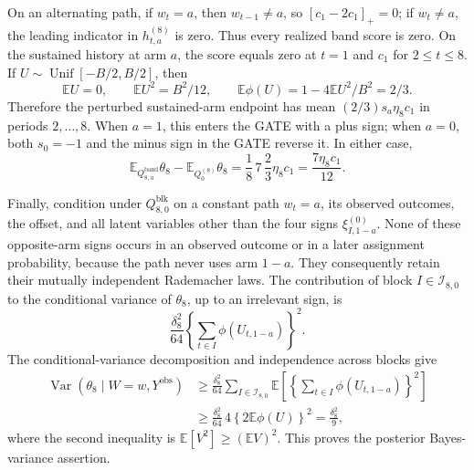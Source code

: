 On an alternating path, if \(w_t=a\), then \(w_{t-1}\ne a\), so \([c_1-2c_1]_+=0\); if \(w_t\ne a\), the leading indicator in \(h_{t,a}^{(8)}\) is zero.  Thus every realized band score is zero.  On the sustained history at arm \(a\), the score equals zero at \(t=1\) and \(c_1\) for \(2\le t\le8\).  If \(U\sim\operatorname{Unif}[-B/2,B/2]\), then
\[
 \mathbb E U=0,
 \qquad
 \mathbb E U^2=B^2/12,
 \qquad
 \mathbb E\phi(U)=1-4\mathbb EU^2/B^2=2/3.
\]
Therefore the perturbed sustained-arm endpoint has mean \((2/3)s_a\eta_8c_1\) in periods \(2,\ldots,8\).  When \(a=1\), this enters the GATE with a plus sign; when \(a=0\), both \(s_0=-1\) and the minus sign in the GATE reverse it.  In either case,
\[
 \mathbb E_{Q_{8,a}^{\mathrm{band}}}\theta_8
 -\mathbb E_{Q_0^{(8)}}\theta_8
 =\frac18\,7\,\frac23\eta_8c_1
 =\frac{7\eta_8c_1}{12}.
\]

Finally, condition under \(Q_{8,0}^{\mathrm{blk}}\) on a constant path \(w_t=a\), its observed outcomes, the offset, and all latent variables other than the four signs \(\xi_{I,1-a}^{(0)}\).  None of these opposite-arm signs occurs in an observed outcome or in a later assignment probability, because the path never uses arm \(1-a\).  They consequently retain their mutually independent Rademacher laws.  The contribution of block \(I\in\mathcal I_{8,0}\) to the conditional variance of \(\theta_8\), up to an irrelevant sign, is
\[
 \frac{\delta_8^2}{64}
 \left\{\sum_{t\in I}\phi(U_{t,1-a})\right\}^2.
\]
The conditional-variance decomposition and independence across blocks give
\[
 \begin{aligned}
 \operatorname{Var}(\theta_8\mid W=w,Y^{\mathrm{obs}})
 &\ge \frac{\delta_8^2}{64}
 \sum_{I\in\mathcal I_{8,0}}
 \mathbb E\left[\left\{\sum_{t\in I}\phi(U_{t,1-a})\right\}^2\right]\\
 &\ge \frac{\delta_8^2}{64}\,4
 \left\{2\mathbb E\phi(U)\right\}^2
 =\frac{\delta_8^2}{9},
 \end{aligned}
\]
where the second inequality is \(\mathbb E[V^2]\ge(\mathbb EV)^2\).  This proves the posterior Bayes-variance assertion.

